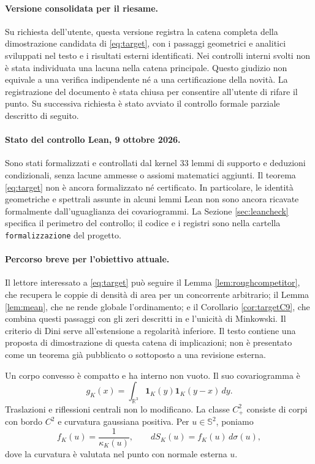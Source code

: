 \documentclass[11pt,a4paper]{article}
\theoremstyle{remark}
\newcommand{\R}{\mathbb R}
\newcommand{\Sph}{\mathbb S^2}
\newcommand{\ind}{\mathbf 1}
\begin{document}
\paragraph{Versione consolidata per il riesame.}
Su richiesta dell'utente, questa versione registra la catena completa
della dimostrazione candidata di \eqref{eq:target}, con i passaggi
geometrici e analitici sviluppati nel testo e i risultati esterni
identificati. Nei controlli interni svolti non è stata individuata
una lacuna nella catena principale. Questo giudizio non equivale a
una verifica indipendente né a una certificazione della novità.
La registrazione del documento è stata chiusa per consentire
all'utente di rifare il punto. Su successiva richiesta è stato
avviato il controllo formale parziale descritto di seguito.

\paragraph{Stato del controllo Lean, 9 ottobre 2026.}
Sono stati formalizzati e controllati dal kernel 33 lemmi di supporto
e deduzioni condizionali, senza lacune ammesse o assiomi matematici
aggiunti. Il teorema \eqref{eq:target} non è ancora formalizzato né
certificato. In particolare, le identità geometriche e spettrali
assunte in alcuni lemmi Lean non sono ancora ricavate formalmente
dall'uguaglianza dei covariogrammi. La Sezione \ref{sec:leancheck}
specifica il perimetro del controllo; il codice e i registri sono
nella cartella \texttt{formalizzazione} del progetto.

\paragraph{Percorso breve per l'obiettivo attuale.}
Il lettore interessato a \eqref{eq:target} può seguire il Lemma
\ref{lem:roughcompetitor}, che recupera le coppie di densità di area
per un concorrente arbitrario; il Lemma \ref{lem:mean}, che ne rende
globale l'ordinamento; e il Corollario \ref{cor:targetC9}, che combina
questi passaggi con gli zeri descritti in \cite{B16} e l'unicità di
Minkowski. Il criterio di Dini serve all'estensione a regolarità
inferiore. Il testo contiene una proposta di dimostrazione di questa
catena di implicazioni; non è presentato come un teorema già
pubblicato o sottoposto a una revisione esterna.

Un corpo convesso è compatto e ha interno non vuoto. Il suo covariogramma è
\[
g_K(x)=\int_{\R^3}\ind_K(y)\ind_K(y-x)\,dy.
\]
Traslazioni e riflessioni centrali non lo modificano. La classe $C^2_+$
consiste di corpi con bordo $C^2$ e curvatura gaussiana positiva.
Per $u\in\Sph$, poniamo
\[
f_K(u)=\frac1{\kappa_K(u)},\qquad dS_K(u)=f_K(u)\,d\sigma(u),
\]
dove la curvatura è valutata nel punto con normale esterna $u$.
\end{document}
